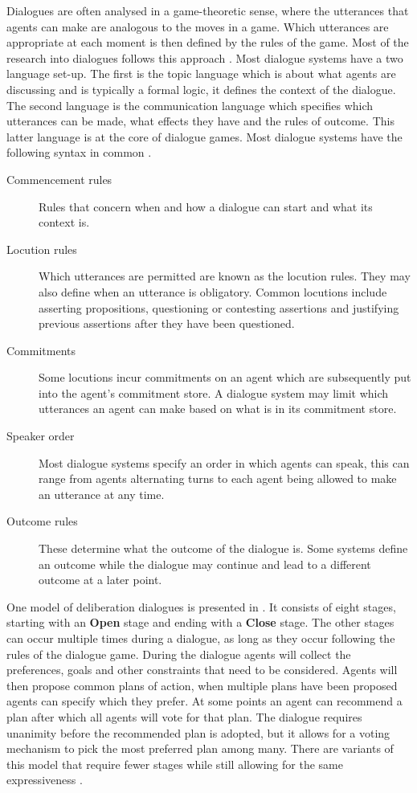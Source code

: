 Dialogues are often analysed in a game-theoretic sense, where the utterances
that agents can make are analogous to the moves in a game. Which utterances are
appropriate at each moment is then defined by the rules of the game. Most of
the research into dialogues follows this approach
\cite{prakken2006,prakken2009}. Most dialogue systems have a two language
set-up. The first is the topic language which is about what agents are
discussing and is typically a formal logic, it defines the context of the
dialogue. The second language is the communication language which specifies
which utterances can be made, what effects they have and the rules of outcome.
This latter language is at the core of dialogue games. Most dialogue systems
have the following syntax in common \cite{prakken2006,prakken2009,mcburney2009}.
\begin{description}
    \item[Commencement rules] Rules that concern when and how a dialogue can
    start and what its context is.
    \item[Locution rules] Which utterances are permitted are known as the
    locution rules. They may also define when an utterance is obligatory.
    Common locutions include asserting propositions, questioning or contesting
    assertions and justifying previous assertions after they have been
    questioned.
    \item[Commitments] Some locutions incur commitments on an agent which are
    subsequently put into the agent's commitment store. A dialogue system may
    limit which utterances an agent can make based on what is in its commitment
    store.
    \item[Speaker order] Most dialogue systems specify an order in which agents
    can speak, this can range from agents alternating turns to each agent being
    allowed to make an utterance at any time.
    \item[Outcome rules] These determine what the outcome of the dialogue is.
    Some systems define an outcome while the dialogue may continue and lead to
    a different outcome at a later point.
\end{description}

One model of deliberation dialogues is presented in \cite{mcburney2007}. It
consists of eight stages, starting with an \textbf{Open} stage and ending with
a \textbf{Close} stage. The other stages can occur multiple times during a
dialogue, as long as they occur following the rules of the dialogue game.
During the dialogue agents will collect the
preferences, goals and other constraints that need to be considered. Agents
will then propose common plans of action, when multiple plans have been
proposed agents can specify which they prefer. At some points an agent can
recommend a plan after which all agents will vote for that plan. The dialogue
requires unanimity before the recommended plan is adopted, but it allows for a
voting mechanism to pick the most preferred plan among many. There are variants
of this model that require fewer stages while still allowing for the same
expressiveness \cite{dunin-keplicz2011}.
